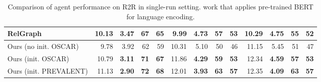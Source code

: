 \documentclass[final]{cvpr}
\newcommand{\high}[1]{{\textbf{\color{blue}#1}}}
\begin{document}
\begin{table*}[t]
\begin{center}
{\begin{tabular}{l|rrrr|rrrr|rrrr}
    RelGraph \cite{hong2020graph} 
        & 10.13 & 3.47 & 67 & 65 & 9.99 & 4.73 & 57 & \textbf{53} & 10.29 & 4.75 & 55 & 52 \\
    \hline
    Ours (no init. OSCAR) 
        & 9.78 & 3.92 & 62 & 59 & 10.31 & 5.10 & 50 & 46 & 11.15 & 5.45 & 51 & 47\\
    Ours (init. OSCAR)
        & 10.79 & \textbf{3.11} & \textbf{71} & \textbf{67} & 11.86 & \textbf{4.29} & \textbf{59} & \textbf{53} & 12.34 & \textbf{4.59} & \textbf{57} & \textbf{53} \\
Ours (init. PREVALENT)
        & 11.13 & \high{2.90} & \high{72} & \high{68} & 12.01 & \high{3.93} & \high{63} & \high{57} & 12.35 & \high{4.09} & \high{63} & \high{57} \\
    \hline \hline
  \end{tabular}}
\end{center}
\caption{Comparison of agent performance on R2R in single-run setting.  work that applies pre-trained BERT for language encoding.}
\label{tab:table_r2r_result}
\end{table*}
\end{document}
